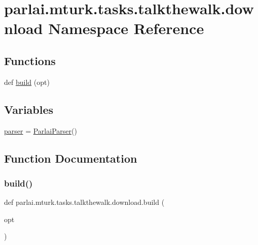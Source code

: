\hypertarget{namespaceparlai_1_1mturk_1_1tasks_1_1talkthewalk_1_1download}{}\section{parlai.\+mturk.\+tasks.\+talkthewalk.\+download Namespace Reference}
\label{namespaceparlai_1_1mturk_1_1tasks_1_1talkthewalk_1_1download}
\subsection*{Functions}
\begin{DoxyCompactItemize}
\item 
def \hyperlink{namespaceparlai_1_1mturk_1_1tasks_1_1talkthewalk_1_1download_a8c0fbb9b6dfe127cb8c1bd6e7c4e33fd}{build} (opt)
\end{DoxyCompactItemize}
\subsection*{Variables}
\begin{DoxyCompactItemize}
\item 
\hyperlink{namespaceparlai_1_1mturk_1_1tasks_1_1talkthewalk_1_1download_afc57e8bd20e5008ba31cf55a9d35df81}{parser} = \hyperlink{classparlai_1_1core_1_1params_1_1ParlaiParser}{Parlai\+Parser}()
\end{DoxyCompactItemize}


\subsection{Function Documentation}
\mbox{\label{namespaceparlai_1_1mturk_1_1tasks_1_1talkthewalk_1_1download_a8c0fbb9b6dfe127cb8c1bd6e7c4e33fd}} 
\subsubsection{\texorpdfstring{build()}{build()}}
{\footnotesize\ttfamily def parlai.\+mturk.\+tasks.\+talkthewalk.\+download.\+build (\begin{DoxyParamCaption}\item[{}]{opt }\end{DoxyParamCaption})}



